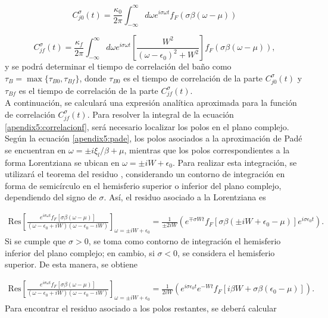 \begin{appendixs}
\begin{equation}
    C^{\sigma}_{j0}(t) = \frac{\kappa_{0}}{2\pi} \int_{-\infty}^{\infty}d\omega e^{i\sigma \omega t} f_{F}(\sigma \beta (\omega-\mu))
    \label{apendix5:correlacion0}
\end{equation}

\begin{equation}
    C^{\sigma}_{jf}(t) = \frac{\kappa_{f}}{2\pi} \int_{-\infty}^{\infty}d\omega e^{i\sigma \omega t}\left[ \frac{W^{2}}{(\omega-\epsilon_{0})^{2} + W^{2}} \right] f_{F}(\sigma \beta (\omega-\mu)),
    \label{apendix5:correlacionf}
\end{equation}
y se podrá determinar el tiempo de correlación del baño como $\tau_{B} = \max\{\tau_{B0}, \tau_{Bf}\}$, donde $\tau_{B0}$ es el tiempo de correlación de la parte $C^{\sigma}_{j0}(t)$ y $\tau_{Bf}$ es el tiempo de correlación de la parte $C^{\sigma}_{jf}(t)$. 
\\

A continuación, se calculará una expresión analítica aproximada para la función de correlación $C^{\sigma}_{jf}(t)$. Para resolver la integral de la ecuación \eqref{apendix5:correlacionf}, será necesario localizar los polos en el plano complejo. Según la ecuación \eqref{apendix5:pade}, los polos asociados a la aproximación de Padé se encuentran en $\omega = \pm i \xi_{l}/\beta + \mu$, mientras que los polos correspondientes a la forma Lorentziana se ubican en $\omega = \pm i W + \epsilon_{0}$. Para realizar esta integración, se utilizará el teorema del residuo \cite{riley2006mathematical}, considerando un contorno de integración en forma de semicírculo en el hemisferio superior o inferior del plano complejo, dependiendo del signo de $\sigma$. Así, el residuo asociado a la Lorentziana es

\begin{align*}
   \text{Res} \left[ \frac{e^{ i\sigma \omega t} f_{F}[\sigma \beta (\omega-\mu)] }{ (\omega-\epsilon_{0} + iW)(\omega -\epsilon_{0} -iW)}\right]_{\omega = \pm i W + \epsilon_{0}} = \frac{1}{\pm 2iW} ( e^{\mp \sigma Wt} f_{F}[\sigma \beta(\pm iW +\epsilon_{0}-\mu)]e^{i\sigma \epsilon_{0}t}). 
\end{align*}
Si se cumple que $\sigma > 0$, se toma como contorno de integración el hemisferio inferior del plano complejo; en cambio, si $\sigma < 0$, se considera el hemisferio superior. De esta manera, se obtiene

\begin{align*}
    \text{Res} \left[ \frac{e^{ i\sigma \omega t} f_{F}[\sigma \beta (\omega-\mu)] }{ (\omega-\epsilon_{0} + iW)(\omega -\epsilon_{0} -iW)}\right]_{\omega = \pm i W + \epsilon_{0}} = \frac{1}{ 2iW} ( e^{i\sigma \epsilon_{0}t}e^{- Wt} f_{F}[i\beta W + \sigma \beta(\epsilon_{0}-\mu)]). 
 \end{align*}
Para encontrar el residuo asociado a los polos restantes, se deberá calcular


\end{appendixs}
